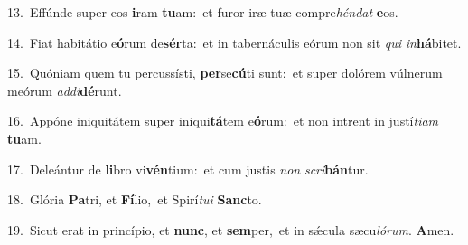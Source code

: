 {\numbfont\textcolor{\numbcolor}{13.}}~Effúnde super eos \textbf{i}\-ram \textbf{tu}\-am:~\star et furor iræ tuæ compre\-\textit{hén}\-\textit{dat} \textbf{e}\-os.\par
{\numbfont\textcolor{\numbcolor}{14.}}~Fiat habitátio e\-\textbf{ó}\-rum de\-\textbf{sér}\-ta:~\star et in tabernáculis eórum non sit \textit{qui} \textit{in}\-\textbf{há}bitet.\par
{\numbfont\textcolor{\numbcolor}{15.}}~Quóniam quem tu percussísti, \textbf{per}\-se\-\textbf{cú}\-ti sunt:~\star et super dolórem vúlnerum meórum \textit{ad}\-\textit{di}\textbf{dé}runt.\par
{\numbfont\textcolor{\numbcolor}{16.}}~Appóne iniquitátem super iniqui\-\textbf{tá}\-tem e\-\textbf{ó}\-rum:~\star et non intrent in justí\-\textit{ti}\-\textit{am} \textbf{tu}\-am.\par
{\numbfont\textcolor{\numbcolor}{17.}}~Deleántur de \textbf{li}\-bro vi\-\textbf{vén}\-tium:~\star et cum justis \textit{non} \textit{scri}\-\textbf{bán}tur.\par
{\numbfont\textcolor{\numbcolor}{18.}}~Glória \textbf{Pa}\-tri, et \textbf{Fí}\-lio,~\star et Spirí\-\textit{tu}\-\textit{i} \textbf{Sanc}\-to.\par
{\numbfont\textcolor{\numbcolor}{19.}}~Sicut erat in princípio, et \textbf{nunc}\-, et \textbf{sem}\-per,~\star et in sǽcula sæcu\-\textit{ló}\-\textit{rum}. \textbf{A}\-men.\par
